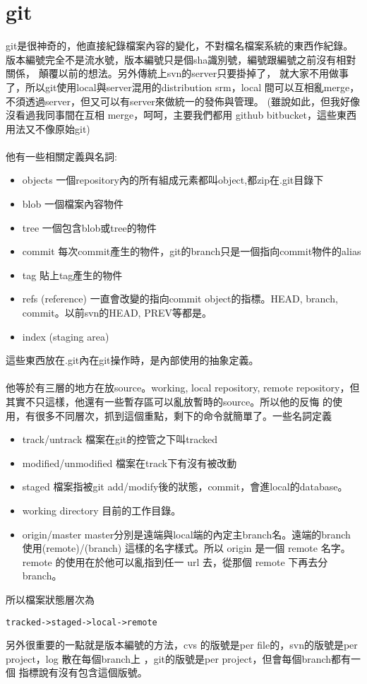 \section{git}
git是很神奇的，他直接紀錄檔案內容的變化，不對檔名檔案系統的東西作紀錄。
版本編號完全不是流水號，版本編號只是個sha識別號，編號跟編號之前沒有相對關係，
顛覆以前的想法。另外傳統上svn的server只要掛掉了，
就大家不用做事了，所以git使用local與server混用的distribution srm，local
間可以互相亂merge，不須透過server，但又可以有server來做統一的發佈與管理。
(雖說如此，但我好像沒看過我同事間在互相 merge，呵呵，主要我們都用 github
bitbucket，這些東西用法又不像原始git)
\\\\
他有一些相關定義與名詞:
\begin{itemize}
  \item objects 一個repository內的所有組成元素都叫object,都zip在.git目錄下
  \item blob 一個檔案內容物件
  \item tree 一個包含blob或tree的物件
  \item commit 每次commit產生的物件，git的branch只是一個指向commit物件的alias
  \item tag 貼上tag產生的物件
  \item refs (reference) 一直會改變的指向commit object的指標。HEAD, branch, 
    commit。以前svn的HEAD, PREV等都是。
  \item index (staging area)
\end{itemize}
這些東西放在.git內在git操作時，是內部使用的抽象定義。
\\\\
他等於有三層的地方在放source。working, local repository, remote
repository，但其實不只這樣，他還有一些暫存區可以亂放暫時的source。所以他的反悔
的使用，有很多不同層次，抓到這個重點，剩下的命令就簡單了。一些名詞定義
\begin{itemize}
  \item track/untrack 檔案在git的控管之下叫tracked
  \item modified/unmodified 檔案在track下有沒有被改動
  \item staged 檔案指被git add/modify後的狀態，commit，會進local的database。
  \item working directory 目前的工作目錄。
  \item origin/master master分別是遠端與local端的內定主branch名。遠端的branch
    使用(remote)/(branch) 這樣的名字樣式。所以 origin 是一個 remote 名字。
    remote 的使用在於他可以亂指到任一 url 去，從那個 remote 下再去分 branch。
\end{itemize}
所以檔案狀態層次為
\begin{verbatim}
tracked->staged->local->remote
\end{verbatim}
另外很重要的一點就是版本編號的方法，cvs 的版號是per file的，svn的版號是per
project，log 散在每個branch上 ，git的版號是per project，但會每個branch都有一個
指標說有沒有包含這個版號。
